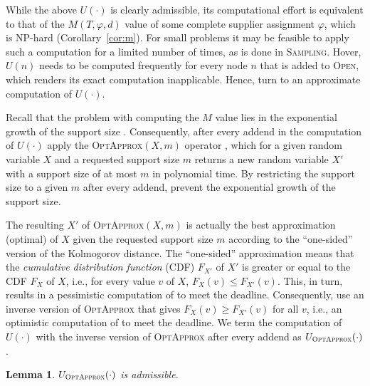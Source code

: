 \documentclass[letterpaper]{article} %
\newtheorem{lemma}{Lemma}
\newcommand{\sampling}{\textsc{Sampling}\xspace}
\newcommand{\open}{\textsc{Open}\xspace}
\newcommand{\optapprox}{\textsc{OptApprox}\xspace}
\begin{document}


While the above $U(\cdot)$ is clearly admissible, its computational effort is equivalent to that of the $M(T,\varphi,d)$ value of some complete supplier assignment $\varphi$, which is NP-hard (Corollary~\ref{cor:m}). For small problems it may be feasible to apply such a computation for a limited number of times, as is done in \sampling. Hover, $U(n)$ needs to be computed frequently for every node $n$ that is added to \open, which renders its exact computation inapplicable. Hence,  turn to an approximate computation of $U(\cdot)$.

Recall that the problem with computing the $M$ value lies in the exponential growth of the support size \cite{cohen2015estimating}. Consequently, after every addend in the computation of $U(\cdot)$  apply the \optapprox$(X,m)$ operator \cite{cohen2018optimal}, which for a given random variable $X$ and a requested support size $m$ returns a new random variable $X'$ with a support size of at most $m$ in polynomial time. By restricting the support size to a given $m$ after every addend,  prevent the exponential growth of the support size.

The resulting $X'$ of \optapprox$(X,m)$ is actually the best approximation (optimal) of $X$ given the requested support size $m$ according to the ``one-sided'' version of the Kolmogorov distance. The ``one-sided'' approximation means that the \emph{cumulative distribution function} (CDF) $F_{X'}$ of $X'$ is greater or equal to the CDF $F_{X}$ of $X$, i.e., for every value $v$ of $X$, $F_{X}(v)\leq F_{X'}(v)$. This, in turn, results in a pessimistic computation of to meet the deadline. Consequently,  use an inverse version of \optapprox that gives $F_{X}(v)\geq F_{X'}(v)$ for all $v$, i.e., an optimistic computation of to meet the deadline. We term the computation of $U(\cdot)$ with the inverse version of \optapprox after every addend as $U_{\optapprox}(\cdot)$.

\begin{lemma}
$U_{\optapprox}(\cdot)$ is admissible.
\label{lem:admissible}
\end{lemma}
\end{document}
